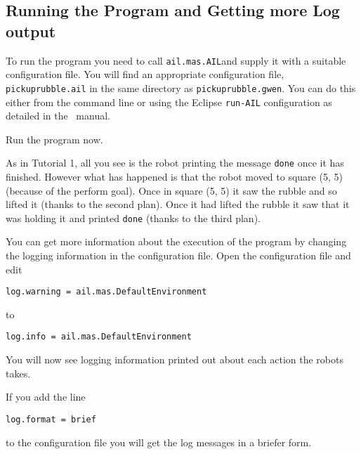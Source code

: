 \subsection{Running the Program and Getting more Log output}

To run the program you need to call \texttt{ail.mas.AIL}and supply it with a suitable configuration file.  You will find an appropriate configuration file, \texttt{pickuprubble.ail} in the same directory as \texttt{pickuprubble.gwen}.  You can do this either from the command line or using the Eclipse \texttt{run-AIL} configuration as detailed in the \mcapl\ manual.

Run the program now.

As in Tutorial 1, all you see is the robot printing the message \lstinline{done} once it has finished.  However what has happened is that the robot moved to square (5, 5) (because of the perform goal).  Once in square (5, 5) it saw the rubble and so lifted it (thanks to the second plan).  Once it had lifted the rubble it saw that it was holding it and printed \lstinline{done} (thanks to the third plan).

You can get more information about the execution of the program by changing the logging information in the configuration file.  Open the configuration file and edit
\begin{verbatim}
log.warning = ail.mas.DefaultEnvironment
\end{verbatim}
to
\begin{verbatim}
log.info = ail.mas.DefaultEnvironment
\end{verbatim}
You will now see logging information printed out about each action the robots takes.

If you add the line
\begin{verbatim}
log.format = brief
\end{verbatim}
to the configuration file you will get the log messages in a briefer form.

